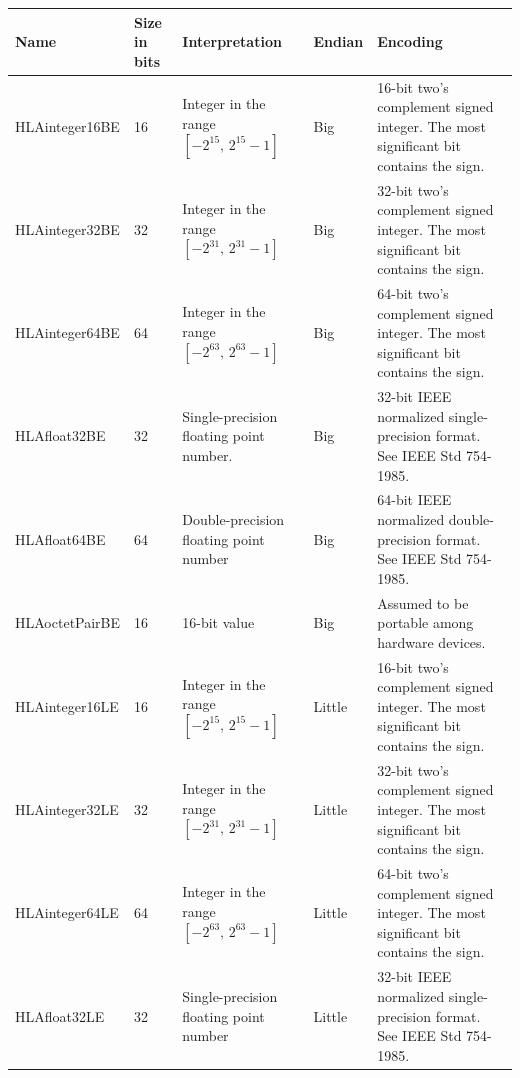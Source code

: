 \newpage
{}
\begingroup
\fontsize{8.0}{9.3}\selectfont
\setlength{\tabcolsep}{2.1pt}
\renewcommand{\arraystretch}{1.60}
\noindent\begin{tabularx}{\textwidth}{|L{81pt}|C{37pt}|L{113pt}|C{40pt}|Y|}
\hline
\centering\bfseries Name & \bfseries Size in bits & \centering\bfseries Interpretation & \bfseries Endian & \centering\arraybackslash\bfseries Encoding \\
\hline
HLAinteger16BE & 16 & Integer in the range $[-2^{15},\,2^{15}-1]$ & Big & 16-bit two's complement signed integer. The most significant bit contains the sign. \\
\hline
HLAinteger32BE & 32 & Integer in the range $[-2^{31},\,2^{31}-1]$ & Big & 32-bit two's complement signed integer. The most significant bit contains the sign. \\
\hline
HLAinteger64BE & 64 & Integer in the range $[-2^{63},\,2^{63}-1]$ & Big & 64-bit two's complement signed integer. The most significant bit contains the sign. \\
\hline
HLAfloat32BE & 32 & Single-precision floating point number. & Big & 32-bit IEEE normalized single-precision format. See IEEE Std 754-1985. \\
\hline
HLAfloat64BE & 64 & Double-precision floating point number & Big & 64-bit IEEE normalized double-precision format. See IEEE Std 754-1985. \\
\hline
HLAoctetPairBE & 16 & 16-bit value & Big & Assumed to be portable among hardware devices. \\
\hline
HLAinteger16LE & 16 & Integer in the range $[-2^{15},\,2^{15}-1]$ & Little & 16-bit two's complement signed integer. The most significant bit contains the sign. \\
\hline
HLAinteger32LE & 32 & Integer in the range $[-2^{31},\,2^{31}-1]$ & Little & 32-bit two's complement signed integer. The most significant bit contains the sign. \\
\hline
HLAinteger64LE & 64 & Integer in the range $[-2^{63},\,2^{63}-1]$ & Little & 64-bit two's complement signed integer. The most significant bit contains the sign. \\
\hline
HLAfloat32LE & 32 & Single-precision floating point number & Little & 32-bit IEEE normalized single-precision format. See IEEE Std 754-1985. \\

\end{tabularx}
